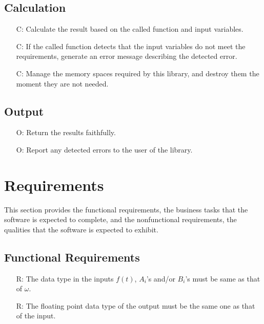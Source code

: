 \documentclass[12pt]{article}
\newcounter{calnum} %
\newcounter{outputnum} %
\newcounter{reqnum} %
\begin{document}
\subsection{Calculation} \label{sec_Calculation}
\begin{itemize}
\item[C\refstepcounter{calnum}\thecalnum \label{Cal:Normal}:] Calculate the result based on the called function and input variables.
\item[C\refstepcounter{calnum}\thecalnum \label{Cal:Error}:] If the called function detects that the input variables do not meet the requirements, generate an error message describing the detected error.
\item[C\refstepcounter{calnum}\thecalnum \label{Cal:Memory}:] Manage the memory spaces required by this library, and destroy them the moment they are not needed.

\end{itemize}
\subsection{Output} \label{sec_Output}    
\begin{itemize}
\item[O\refstepcounter{outputnum}\theoutputnum \label{Output:Faithful}:] Return the results faithfully.
\item[O\refstepcounter{outputnum}\theoutputnum \label{Output:Error}:] Report any detected errors to the user of the library.
\end{itemize}
\section{Requirements}

This section provides the functional requirements, the business tasks that the
software is expected to complete, and the nonfunctional requirements, the
qualities that the software is expected to exhibit.

\subsection{Functional Requirements}

\noindent \begin{itemize}

\item[R\refstepcounter{reqnum}\thereqnum \label{R_Inputs}:] The data type in the inputs $f(t)$, $A_i$'s and/or $B_i$'s must be same as that of $\omega$. 

\item[R\refstepcounter{reqnum}\thereqnum \label{R_Output}:] The floating point data type of the output must be the same one as that of the input.
\end{itemize}
\end{document}
